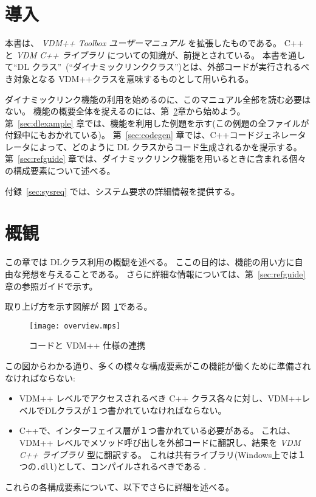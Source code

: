 \documentclass[\pformat,12pt]{jarticle}
\newcommand{\vdmcpplib}{\textit{VDM C++ ライブラリ}}
\begin{document}


\section{導入}

本書は、 {\it VDM++ Toolbox ユーザーマニュアル} \cite{UserManPP-SCSK}を拡張したものである。
C++ \cite{Stroustrup91} と {\vdmcpplib}\cite{LibMan-SCSK} についての知識が、前提とされている。
本書を通して``DL クラス''~(``ダイナミックリンククラス'')とは、外部コードが実行されるべき対象となる VDM++クラスを意味するものとして用いられる。

ダイナミックリンク機能の利用を始めるのに、このマニュアル全部を読む必要はない。
機能の概要全体を捉えるのには、第~\ref{sec:overview}章から始めよう。
第~\ref{sec:dlexample} 章では、機能を利用した例題を示す(この例題の全ファイルが付録中にもおかれている)。
第~\ref{sec:codegen} 章では、C++コードジェネレータレータによって、どのように DL クラスからコード生成されるかを提示する。
第~\ref{sec:refguide} 章では、ダイナミックリンク機能を用いるときに含まれる個々の構成要素について述べる。

付録~\ref{sec:sysreq} では、システム要求の詳細情報を提供する。




\section{概観}\label{sec:overview}

この章では DLクラス利用の概観を述べる。 
ここの目的は、機能の用い方に自由な発想を与えることである。
さらに詳細な情報については、第~\ref{sec:refguide}章の参照ガイドで示す。 

取り上げ方を示す図解が 図~\ref{idea}である。
\begin{figure}
\begin{center}
\texttt{[image: overview.mps]}
\caption{コードと VDM++ 仕様の連携\label{idea}}
\end{center}
\end{figure}
この図からわかる通り、多くの様々な構成要素がこの機能が働くために準備されなければならない:
\begin{itemize}
\item  VDM++ レベルでアクセスされるべき C++ クラス各々に対し、VDM++レベルでDLクラスが１つ書かれていなければならない。
\item  C++で、インターフェイス層が１つ書かれている必要がある。
これは、 VDM++ レベルでメソッド呼び出しを外部コードに翻訳し、結果を {\vdmcpplib} 型に翻訳する。
これは共有ライブラリ(Windows上では１つの\texttt{.dll})として、コンパイルされるべきである .
\end{itemize}
これらの各構成要素について、以下でさらに詳細を述べる。
\end{document}
